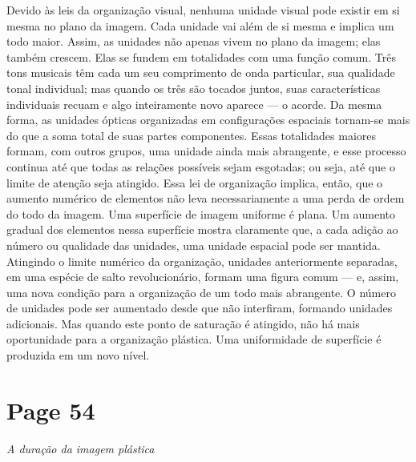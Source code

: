 \documentclass[a4paper]{article}
\begin{document}
Devido às leis da organização visual, nenhuma unidade visual pode existir em si mesma no plano da imagem. Cada unidade vai além de si mesma e implica um todo maior. Assim, as unidades não apenas vivem no plano da imagem; elas também crescem. Elas se fundem em totalidades com uma função comum. Três tons musicais têm cada um seu comprimento de onda particular, sua qualidade tonal individual; mas quando os três são tocados juntos, suas características individuais recuam e algo inteiramente novo aparece --- o acorde. Da mesma forma, as unidades ópticas organizadas em configurações espaciais tornam-se mais do que a soma total de suas partes componentes. Essas totalidades maiores formam, com outros grupos, uma unidade ainda mais abrangente, e esse processo continua até que todas as relações possíveis sejam esgotadas; ou seja, até que o limite de atenção seja atingido. Essa lei de organização implica, então, que o aumento numérico de elementos não leva necessariamente a uma perda de ordem do todo da imagem. Uma superfície de imagem uniforme é plana. Um aumento gradual dos elementos nessa superfície mostra claramente que, a cada adição ao número ou qualidade das unidades, uma unidade espacial pode ser mantida. Atingindo o limite numérico da organização, unidades anteriormente separadas, em uma espécie de salto revolucionário, formam uma figura comum --- e, assim, uma nova condição para a organização de um todo mais abrangente. O número de unidades pode ser aumentado desde que não interfiram, formando unidades adicionais. Mas quando este ponto de saturação é atingido, não há mais oportunidade para a organização plástica. Uma uniformidade de superfície é produzida em um novo nível.

\newpage
\section*{Page 54}

\begin{center}
\large\textit{A duração da imagem plástica}
\end{center}
\end{document}
